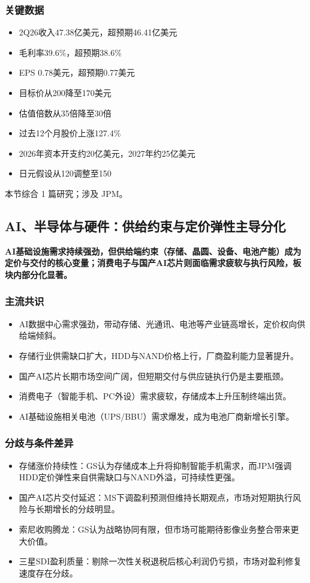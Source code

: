 \documentclass[11pt]{ctexart}
\begin{document}
\subsubsection*{关键数据}
\begin{itemize}
  \item 2Q26收入47.38亿美元，超预期46.41亿美元
  \item 毛利率39.6\%，超预期38.6\%
  \item EPS 0.78美元，超预期0.77美元
  \item 目标价从200降至170美元
  \item 估值倍数从35倍降至30倍
  \item 过去12个月股价上涨127.4\%
  \item 2026年资本开支约20亿美元，2027年约25亿美元
  \item 日元假设从120调整至150
\end{itemize}
{\small\color{refgray}本节综合 1 篇研究；涉及 JPM。}
\newpage
\subsection{AI、半导体与硬件：供给约束与定价弹性主导分化}
\textbf{AI基础设施需求持续强劲，但供给端约束（存储、晶圆、设备、电池产能）成为定价与交付的核心变量；消费电子与国产AI芯片则面临需求疲软与执行风险，板块内部分化显著。}
\subsubsection*{主流共识}
\begin{itemize}
  \item AI数据中心需求强劲，带动存储、光通讯、电池等产业链高增长，定价权向供给端倾斜。
  \item 存储行业供需缺口扩大，HDD与NAND价格上行，厂商盈利能力显著提升。
  \item 国产AI芯片长期市场空间广阔，但短期交付与供应链执行仍是主要瓶颈。
  \item 消费电子（智能手机、PC外设）需求疲软，存储成本上升压制终端出货。
  \item AI基础设施相关电池（UPS/BBU）需求爆发，成为电池厂商新增长引擎。
\end{itemize}
\subsubsection*{分歧与条件差异}
\begin{itemize}
  \item 存储涨价持续性：GS认为存储成本上升将抑制智能手机需求，而JPM强调HDD定价弹性来自供需缺口与NAND外溢，可持续性更强。
  \item 国产AI芯片交付延迟：MS下调盈利预测但维持长期观点，市场对短期执行风险与长期增长的分歧明显。
  \item 索尼收购腾龙：GS认为战略协同有限，但市场可能期待影像业务整合带来更大价值。
  \item 三星SDI盈利质量：剔除一次性关税退税后核心利润仍亏损，市场对盈利修复速度存在分歧。
\end{itemize}
\end{document}
